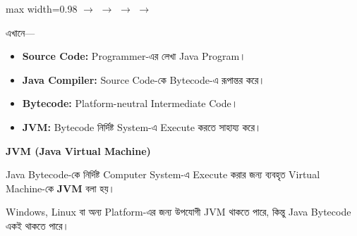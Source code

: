 \begin{center}
\begin{adjustbox}{max width=0.98\linewidth}
\(\longrightarrow\)
\(\longrightarrow\)
\(\longrightarrow\)
\(\longrightarrow\)
\end{adjustbox}
\end{center}

এখানে—

\begin{itemize}

\item \textbf{Source Code:} Programmer-এর লেখা Java Program।

\item \textbf{Java Compiler:} Source Code-কে Bytecode-এ রূপান্তর করে।

\item \textbf{Bytecode:} Platform-neutral Intermediate Code।

\item \textbf{JVM:} Bytecode নির্দিষ্ট System-এ Execute করতে সাহায্য করে।

\end{itemize}


\begin{definitionbox}

\textbf{\color{darkTeal}JVM (Java Virtual Machine)}

Java Bytecode-কে নির্দিষ্ট Computer System-এ Execute করার জন্য
ব্যবহৃত Virtual Machine-কে \textbf{JVM} বলা হয়।

\end{definitionbox}

Windows, Linux বা অন্য Platform-এর জন্য উপযোগী JVM থাকতে পারে,
কিন্তু Java Bytecode একই থাকতে পারে।

